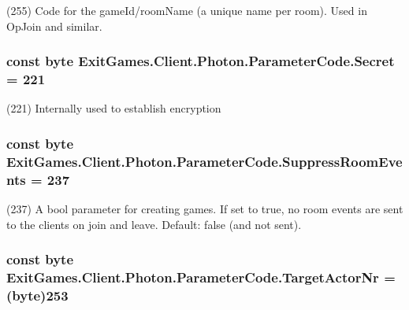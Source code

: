 (255) Code for the game\+Id/room\+Name (a unique name per room). Used in Op\+Join and similar.

\subsubsection[{\texorpdfstring{Secret}{Secret}}]{\setlength{\rightskip}{0pt plus 5cm}const byte Exit\+Games.\+Client.\+Photon.\+Parameter\+Code.\+Secret = 221}\hypertarget{class_exit_games_1_1_client_1_1_photon_1_1_parameter_code_ae8b26169fb98f652d3ace0899c8a13e7}{}\label{class_exit_games_1_1_client_1_1_photon_1_1_parameter_code_ae8b26169fb98f652d3ace0899c8a13e7}


(221) Internally used to establish encryption

\subsubsection[{\texorpdfstring{Suppress\+Room\+Events}{SuppressRoomEvents}}]{\setlength{\rightskip}{0pt plus 5cm}const byte Exit\+Games.\+Client.\+Photon.\+Parameter\+Code.\+Suppress\+Room\+Events = 237}\hypertarget{class_exit_games_1_1_client_1_1_photon_1_1_parameter_code_a89faf31fa005273789198373b5e3dabf}{}\label{class_exit_games_1_1_client_1_1_photon_1_1_parameter_code_a89faf31fa005273789198373b5e3dabf}


(237) A bool parameter for creating games. If set to true, no room events are sent to the clients on join and leave. Default\+: false (and not sent).

\subsubsection[{\texorpdfstring{Target\+Actor\+Nr}{TargetActorNr}}]{\setlength{\rightskip}{0pt plus 5cm}const byte Exit\+Games.\+Client.\+Photon.\+Parameter\+Code.\+Target\+Actor\+Nr = (byte)253}\hypertarget{class_exit_games_1_1_client_1_1_photon_1_1_parameter_code_a95715a5fafe5254ee1e792419867a8da}{}\label{class_exit_games_1_1_client_1_1_photon_1_1_parameter_code_a95715a5fafe5254ee1e792419867a8da}


